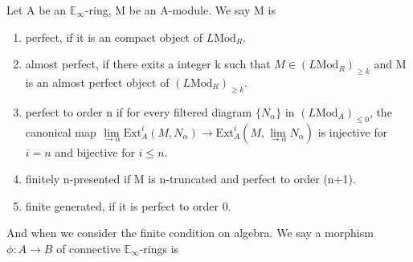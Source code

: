\documentclass[12pt]{article}
\theoremstyle{thry}
\def  \Ext      {\mathrm{Ext}}
\def  \Mod      {\mathrm{Mod}}
\def  \be       {\mathbb{E}}
\begin{document}
Let A be an $\be_{\infty}$-ring, M be an A-module. We say M is
\begin{enumerate}
	\item perfect, if it is an  compact object of $L \Mod_R$.
	\item almost perfect, if there exits a integer k such that  $M \in (L\Mod_R)_{\geq k}$ and M is an almost perfect object of $ (L\Mod_R)_{\geq k}$.
	\item perfect to order n  if for every filtered diagram $\{N_{\alpha}\}$ in $(L\Mod_A)_{\leq 0}$, the canonical map $\underset{\rightarrow \alpha}{\lim}  \Ext^{i}_A (M, N_{\alpha})  \to  \Ext^i_A(M,\underset{\rightarrow \alpha}{\lim}  N_{\alpha} )$ is injective for $i=n$ and bijective for $i \leq n$. 
	\item finitely n-presented if M is  n-truncated and perfect to order (n+1).
	\item finite generated, if it is perfect  to order 0.
\end{enumerate}


And when we  consider the  finite condition on algebra.  We say a morphism $\phi: A \to B$ of connective $\be_{\infty}$-rings  is
\end{document}
